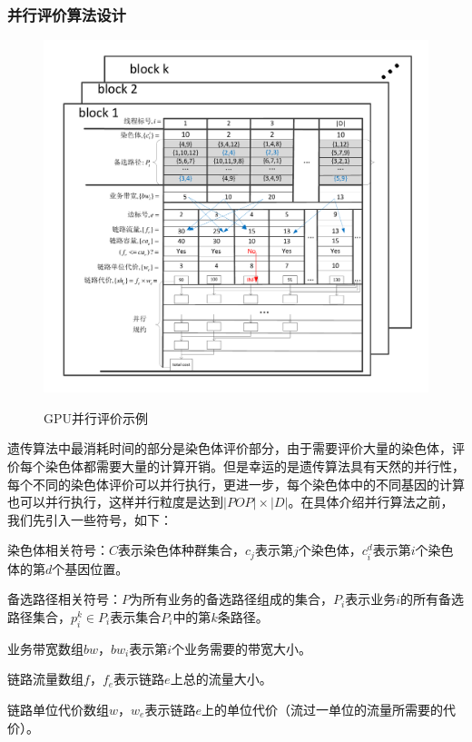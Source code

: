 \subsubsection{并行评价算法设计}
\begin{figure}
\setlength{\abovecaptionskip}{-0.5cm}
\begin{center}
{\includegraphics[width=1 \textwidth]{figures/GPUfitness.pdf}}
\end{center}
\caption{{\footnotesize{GPU并行评价示例}}}
\label{fitness}
\end{figure}
遗传算法中最消耗时间的部分是染色体评价部分，由于需要评价大量的染色体，评价每个染色体都需要大量的计算开销。但是幸运的是遗传算法具有天然的并行性，每个不同的染色体评价可以并行执行，更进一步，每个染色体中的不同基因的计算也可以并行执行，这样并行粒度是达到$|POP|\times|D|$。在具体介绍并行算法之前，我们先引入一些符号，如下：

染色体相关符号：$C$表示染色体种群集合，$c_j$表示第$j$个染色体，$c^d_i$表示第$i$个染色体的第$d$个基因位置。

备选路径相关符号：$P$为所有业务的备选路径组成的集合，$P_i$表示业务$i$的所有备选路径集合，$p_i^k \in P_i$表示集合$P_i$中的第$k$条路径。

业务带宽数组$bw$，$bw_i$表示第$i$个业务需要的带宽大小。

链路流量数组$f$，$f_e$表示链路$e$上总的流量大小。

链路单位代价数组$w$，$w_e$表示链路$e$上的单位代价（流过一单位的流量所需要的代价）。

